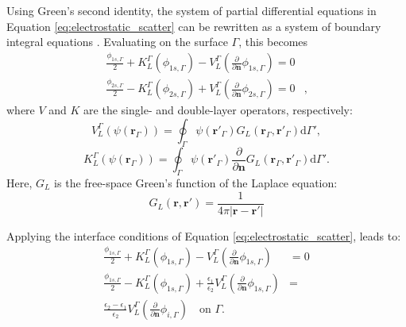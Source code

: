 Using Green's second identity, the system of partial differential equations 
in Equation \eqref{eq:electrostatic_scatter} can be rewritten as a system 
of boundary integral equations \cite{BrebbiaDominguez1992}. Evaluating on the surface $\Gamma$, this
becomes
%
\begin{align} \label{eq:integral_eq_lspr_nobc}
\frac{\phi_{1s,\Gamma}}{2}+ K_{L}^{\Gamma}(\phi_{1s,\Gamma}) - V_{L}^{\Gamma} \left(\frac{\partial}{\partial \mathbf{n}}\phi_{1s,\Gamma} \right) = 0&  \nonumber \\
\frac{\phi_{2s,\Gamma}}{2} - K_{L}^{\Gamma}(\phi_{2s,\Gamma}) + V_{L}^{\Gamma} \left( \frac{\partial}{\partial \mathbf{n}} \phi_{2s,\Gamma} \right) = 0&,
\end{align}
%
where $V$ and $K$ are the single- and double-layer operators, respectively:
%
\begin{equation}\label{eq:single_layer}
V^{\Gamma}_L (\psi(\mathbf{r}_\Gamma)) = \oint_\Gamma \psi(\mathbf{r}'_\Gamma) G_L(\mathbf{r}_\Gamma, \mathbf{r}'_\Gamma) \text{d} \Gamma',
\end{equation}
%
\begin{equation}\label{eq:double_layer}
K^{\Gamma}_L (\psi(\mathbf{r}_\Gamma)) = \oint_\Gamma \psi(\mathbf{r}'_\Gamma) \frac{\partial}{\partial \mathbf{n}}G_L(\mathbf{r}_\Gamma, \mathbf{r}'_\Gamma) \text{d} \Gamma'.
\end{equation}
%
\noindent Here, $G_L$ is the free-space Green's function of the Laplace equation:
%
\begin{equation}
G_L(\mathbf{r},\mathbf{r}') = \frac{1}{4\pi|\mathbf{r}-\mathbf{r}'|}
\end{equation}

\noindent Applying the interface conditions of Equation \eqref{eq:electrostatic_scatter},
leads to:
%
\begin{align} \label{eq:integral_eq_lspr}
\frac{\phi_{1s,\Gamma}}{2}+ K_{L}^{\Gamma}(\phi_{1s,\Gamma}) - V_{L}^{\Gamma} \left(\frac{\partial}{\partial \mathbf{n}}\phi_{1s,\Gamma} \right) &= 0  \nonumber \\
\frac{\phi_{1s,\Gamma}}{2} - K_{L}^{\Gamma}(\phi_{1s,\Gamma}) + \frac{\epsilon_1}{\epsilon_2}V_{L}^{\Gamma} \left( \frac{\partial}{\partial \mathbf{n}} \phi_{1s,\Gamma}  \right) &= \nonumber \\
 \frac{\epsilon_2-\epsilon_1}{\epsilon_2}V_{L}^{\Gamma}\left( \frac{\partial}{\partial \mathbf{n}} \phi_{i,\Gamma} \right)\quad \text{on $\Gamma$.}
\end{align}



